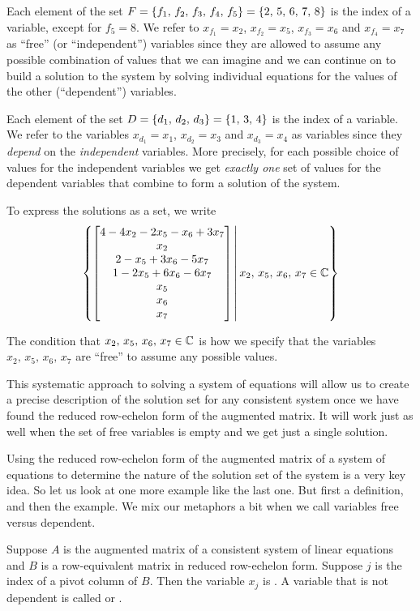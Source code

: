 \documentclass{ximera}
\begin{document}
\begin{example}
Each element of the set $F=\left\{f_1,\,f_2,\,f_3,\,f_4,\,f_5\right\}=\left\{2,\,5,\,6,\,7,\,8\right\}$ is the index of a variable, except for $f_5=8$.  We refer to $x_{f_1}=x_2$, $x_{f_2}=x_5$, $x_{f_3}=x_6$ and $x_{f_4}=x_7$ as ``free'' (or ``independent'') variables since they are allowed to assume any possible combination of values that we can imagine and we can continue on to build a solution to the system by solving individual equations for the values of the other (``dependent'') variables.

Each element of the set $D=\left\{d_1,\,d_2,\,d_3\right\}=\left\{1,\,3,\,4\right\}$ is the index of a variable.  We refer to the variables $x_{d_1}=x_1$, $x_{d_2}=x_3$ and $x_{d_3}=x_4$ as  
 variables since they \textit{depend} on the \textit{independent} variables.  More precisely, for each possible choice of values for the independent variables we get \textit{exactly one} set of values for the dependent variables that combine to form a solution of the system.

To express the solutions as a set, we write
\[
\left\lbrace
\begin{bmatrix}
4-4x_2-2x_5-x_6+3x_7\\
x_2\\
2-x_5+3x_6-5x_7\\
1-2x_5+6x_6-6x_7\\
x_5\\
x_6\\
x_7
\end{bmatrix}
\,\middle|\,
x_2,\,x_5,\,x_6,\,x_7\in\mathbb{C}
\right\rbrace
\]

The condition that $x_2,\,x_5,\,x_6,\,x_7\in\complex{\null}$ is how we specify that the variables $x_2,\,x_5,\,x_6,\,x_7$ are ``free'' to assume any possible values.
\end{example}

This systematic approach to solving a system of equations will allow us to create a precise description of the solution set for any consistent system once we have found the reduced row-echelon form of the augmented matrix.  It will work just as well when the set of free variables is empty and we get just a single solution.

Using the reduced row-echelon form of the augmented matrix of a system of equations to determine the nature of the solution set of the system is a very key idea.  So let us look at one more example like the last one.  But first a definition, and then the example.   We mix our metaphors a bit when we call variables free versus dependent.

\begin{definition}
Suppose $A$ is the augmented matrix of a consistent system of linear equations and $B$ is a row-equivalent matrix in reduced row-echelon form.  Suppose $j$ is the index of a pivot column of $B$.  Then the variable $x_j$ is .  A variable that is not dependent is called  or .
\end{definition}
\end{document}
